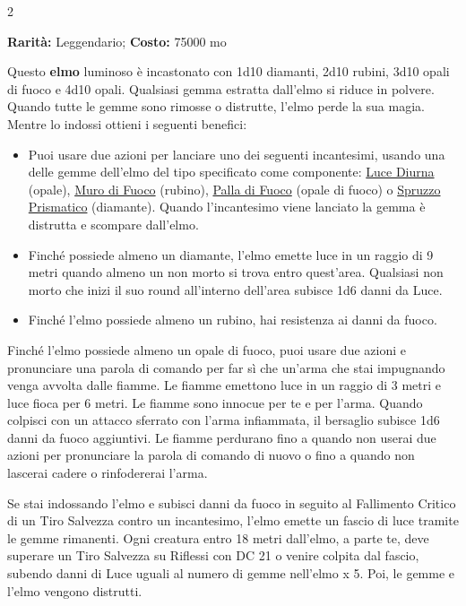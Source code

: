 \begin{multicols}{2}

\textbf{Rarità:} Leggendario; \textbf{Costo:} 75000 mo

Questo \textbf{elmo} luminoso è incastonato con 1d10 diamanti, 2d10 rubini, 3d10 opali di fuoco e 4d10 opali. Qualsiasi gemma estratta dall'elmo si riduce in polvere. Quando tutte le gemme sono rimosse o distrutte, l'elmo perde la sua magia. Mentre lo indossi ottieni i seguenti benefici:

\smallskip

\begin{itemize}[leftmargin=*] \setlength{\itemsep}{0pt}
\item
Puoi usare due azioni per lanciare uno dei seguenti incantesimi, usando una delle gemme dell'elmo del tipo specificato come componente: \hyperlink{Luce Diurna}{Luce Diurna} (opale), \hyperlink{Muro di Fuoco}{Muro di Fuoco} (rubino), \hyperlink{Palla di Fuoco}{Palla di Fuoco} (opale di fuoco) o \hyperlink{Spruzzo Prismatico}{Spruzzo Prismatico} (diamante). Quando l'incantesimo viene lanciato la gemma è distrutta e scompare dall'elmo.

\item
Finché possiede almeno un diamante, l'elmo emette luce in un raggio di 9 metri quando almeno un non morto si trova entro quest'area. Qualsiasi non morto che inizi il suo round all'interno dell'area subisce 1d6 danni da Luce.

\item
Finché l'elmo possiede almeno un rubino, hai resistenza ai danni da fuoco.
\end{itemize}

\smallskip

Finché l'elmo possiede almeno un opale di fuoco, puoi usare due azioni e pronunciare una parola di comando per far sì che un'arma che stai impugnando venga avvolta dalle fiamme. Le fiamme emettono luce in un raggio di 3 metri e luce fioca per 6 metri. Le fiamme sono innocue per te e per l'arma. Quando colpisci con un attacco sferrato con l'arma infiammata, il bersaglio subisce 1d6 danni da fuoco aggiuntivi. Le fiamme perdurano fino a quando non userai due azioni per pronunciare la parola di comando di nuovo o fino a quando non lascerai cadere o rinfodererai l'arma.

Se stai indossando l'elmo e subisci danni da fuoco in seguito al Fallimento Critico di un Tiro Salvezza contro un incantesimo, l'elmo emette un fascio di luce tramite le gemme rimanenti. Ogni creatura entro 18 metri dall'elmo, a parte te, deve superare un Tiro Salvezza su Riflessi con DC 21 o venire colpita dal fascio, subendo danni di Luce uguali al numero di gemme nell'elmo x 5. Poi, le gemme e l'elmo vengono distrutti.


\end{multicols}
